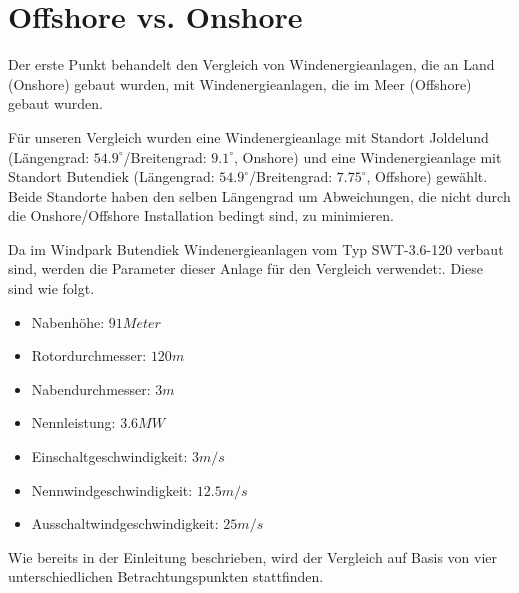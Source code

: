 \documentclass[a4paper,12pt]{article}
\begin{document}
	\section{Offshore vs. Onshore}
	Der erste Punkt behandelt den Vergleich von Windenergieanlagen, die an Land (Onshore) gebaut wurden, mit Windenergieanlagen, die im Meer (Offshore) gebaut wurden.\\ \par
	\noindent Für unseren Vergleich wurden eine Windenergieanlage mit Standort Joldelund (Längengrad: $54.9^{\circ}$/Breitengrad: $9.1^{\circ}$, Onshore) und eine Windenergieanlage mit Standort Butendiek (Längengrad: $54.9^{\circ}$/Breitengrad: $7.75^{\circ}$, Offshore) gewählt. Beide Standorte haben den selben Längengrad um Abweichungen, die nicht durch die Onshore/Offshore Installation bedingt sind, zu minimieren.\\ \par \noindent Da im Windpark Butendiek Windenergieanlagen vom Typ SWT-3.6-120 verbaut sind, werden die Parameter dieser Anlage für den Vergleich verwendet:.\newline
	Diese sind wie folgt.
	\begin{itemize}
		\item Nabenhöhe: $91 Meter$
		\item Rotordurchmesser: $120m$
		\item Nabendurchmesser: $3m$
		\item Nennleistung: $3.6MW$
		\item Einschaltgeschwindigkeit: $3m/s$
		\item Nennwindgeschwindigkeit: $12.5m/s$
		\item Ausschaltwindgeschwindigkeit: $25m/s$
	\end{itemize}
	\noindent Wie bereits in der Einleitung beschrieben, wird der Vergleich auf Basis von vier unterschiedlichen Betrachtungspunkten stattfinden.
\end{document}
